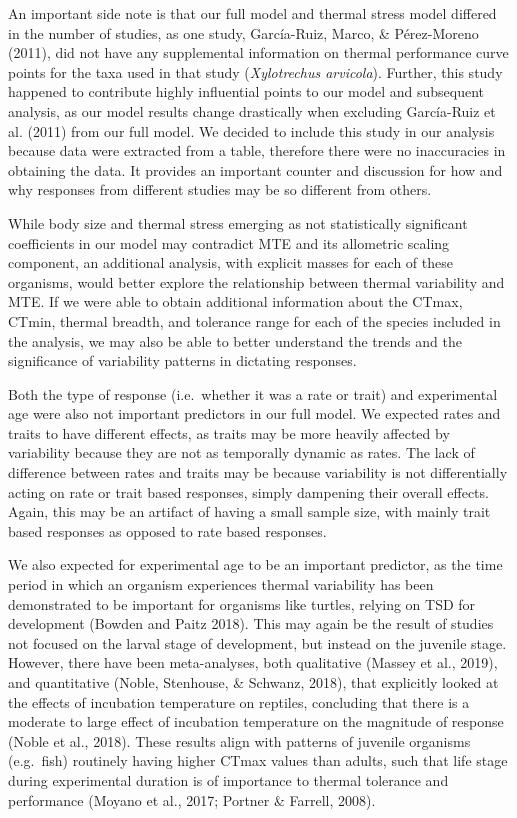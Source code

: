 \documentclass[12pt,twoside]{reedthesis}
\begin{document}
An important side note is that our full model and thermal stress model differed in the number of studies, as one study, García-Ruiz, Marco, \& Pérez-Moreno (2011), did not have any supplemental information on thermal performance curve points for the taxa used in that study (\emph{Xylotrechus arvicola}). Further, this study happened to contribute highly influential points to our model and subsequent analysis, as our model results change drastically when excluding García-Ruiz et al. (2011) from our full model. We decided to include this study in our analysis because data were extracted from a table, therefore there were no inaccuracies in obtaining the data. It provides an important counter and discussion for how and why responses from different studies may be so different from others.

While body size and thermal stress emerging as not statistically significant coefficients in our model may contradict MTE and its allometric scaling component, an additional analysis, with explicit masses for each of these organisms, would better explore the relationship between thermal variability and MTE. If we were able to obtain additional information about the CTmax, CTmin, thermal breadth, and tolerance range for each of the species included in the analysis, we may also be able to better understand the trends and the significance of variability patterns in dictating responses.

Both the type of response (i.e.~whether it was a rate or trait) and experimental age were also not important predictors in our full model. We expected rates and traits to have different effects, as traits may be more heavily affected by variability because they are not as temporally dynamic as rates. The lack of difference between rates and traits may be because variability is not differentially acting on rate or trait based responses, simply dampening their overall effects. Again, this may be an artifact of having a small sample size, with mainly trait based responses as opposed to rate based responses.

We also expected for experimental age to be an important predictor, as the time period in which an organism experiences thermal variability has been demonstrated to be important for organisms like turtles, relying on TSD for development (Bowden and Paitz 2018). This may again be the result of studies not focused on the larval stage of development, but instead on the juvenile stage. However, there have been meta-analyses, both qualitative (Massey et al., 2019), and quantitative (Noble, Stenhouse, \& Schwanz, 2018), that explicitly looked at the effects of incubation temperature on reptiles, concluding that there is a moderate to large effect of incubation temperature on the magnitude of response (Noble et al., 2018). These results align with patterns of juvenile organisms (e.g.~fish) routinely having higher CTmax values than adults, such that life stage during experimental duration is of importance to thermal tolerance and performance (Moyano et al., 2017; Portner \& Farrell, 2008).
\end{document}
